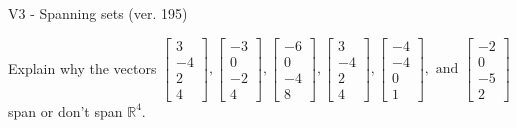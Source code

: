 \begin{exercise}
  \begin{exerciseTitle}V3 - Spanning sets (ver. 195)\end{exerciseTitle}
  \begin{exerciseStatement}
    Explain why the vectors \(\left[\begin{array}{r}
3 \\
-4 \\
2 \\
4
\end{array}\right] , \left[\begin{array}{r}
-3 \\
0 \\
-2 \\
4
\end{array}\right] , \left[\begin{array}{r}
-6 \\
0 \\
-4 \\
8
\end{array}\right] , \left[\begin{array}{r}
3 \\
-4 \\
2 \\
4
\end{array}\right] , \left[\begin{array}{r}
-4 \\
-4 \\
0 \\
1
\end{array}\right] , \text{ and } \left[\begin{array}{r}
-2 \\
0 \\
-5 \\
2
\end{array}\right]\) span or don't span \(\mathbb{R}^4\). 
	



\end{exerciseStatement}
\end{exercise}
